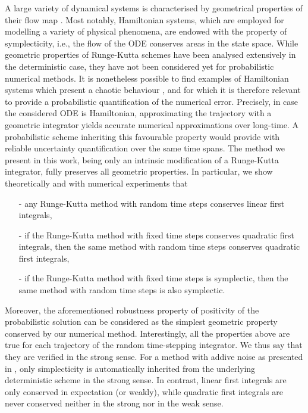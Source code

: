 \documentclass{siamart1116}
\numberwithin{theorem}{section}
\newcommand{\corr}[1]{{\color{bordeaux}#1}}
\begin{document}
A large variety of dynamical systems is characterised by geometrical properties of their flow map \cite{HLW06}. Most notably, Hamiltonian systems, which are employed for modelling a variety of physical phenomena, are endowed with the property of symplecticity, i.e., the flow of the ODE conserves areas in the state space. While geometric properties of Runge-Kutta schemes have been analysed extensively in the deterministic case, they have not been considered yet \corr{for probabilistic numerical methods}. It is nonetheless possible to find examples of Hamiltonian systems which present a chaotic behaviour \cite{HeH64}, and for which it is therefore relevant to provide a probabilistic quantification of the numerical error. Precisely, in case the considered ODE is Hamiltonian, approximating the trajectory with a geometric integrator yields accurate numerical approximations \corr{over} long-time. A probabilistic scheme inheriting this favourable property would provide with reliable uncertainty quantification over the same time spans. The method we present in this work, being only an intrinsic modification of a Runge-Kutta integrator, fully preserves all geometric properties. In particular, we show theoretically and with numerical experiments that
\begin{itemize}
	\item[-] any Runge-Kutta method with random time steps conserves linear first integrals,
	\item[-] if the Runge-Kutta method with fixed time steps conserves quadratic first integrals, then the same method with random time steps conserves quadratic first integrals,
	\item[-] if the Runge-Kutta method with fixed time steps is symplectic, then the same method with random time steps \corr{is also symplectic.}
\end{itemize}
Moreover, the aforementioned robustness property of positivity of the probabilistic solution can be considered as the simplest geometric property conserved by our numerical method. Interestingly, all the properties above are true for each trajectory of the random time-stepping integrator. We thus say that they are verified in the strong sense. For a \corr{method with addive noise as presented in \cite{CGS16}}, only simplecticity is automatically inherited from the underlying deterministic scheme in the strong sense. \corr{In contrast}, linear first integrals are only conserved in expectation (or weakly), while quadratic first integrals are never conserved neither in the strong nor in the weak sense. 
\end{document}
